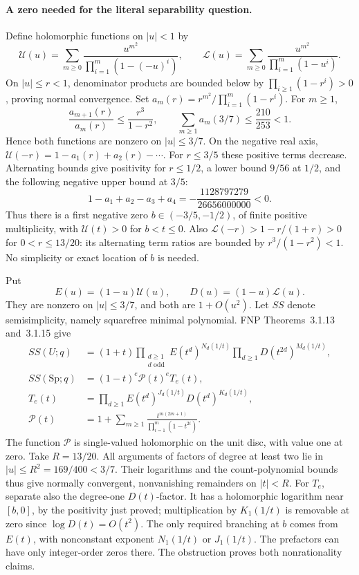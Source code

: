 \paragraph{A zero needed for the literal separability question.}
Define holomorphic functions on \(|u|<1\) by
\[
 \mathcal U(u)=\sum_{m\ge0}
       \frac{u^{m^2}}{\prod_{i=1}^m(1-(-u)^i)},\qquad
 \mathcal L(u)=\sum_{m\ge0}
       \frac{u^{m^2}}{\prod_{i=1}^m(1-u^i)}.
\]
On \(|u|\le r<1\), denominator products are bounded below by
\(\prod_{i\ge1}(1-r^i)>0\), proving normal convergence.
Set
\(a_m(r)=r^{m^2}/\prod_{i=1}^m(1-r^i)\).
For \(m\ge1\),
\[
 \frac{a_{m+1}(r)}{a_m(r)}
 \le\frac{r^3}{1-r^2},\qquad
 \sum_{m\ge1}a_m(3/7)\le\frac{210}{253}<1.
\]
Hence both functions are nonzero on \(|u|\le3/7\).
On the negative real axis,
\(\mathcal U(-r)=1-a_1(r)+a_2(r)-\cdots\).
For \(r\le3/5\) these positive terms decrease. Alternating bounds
give positivity for \(r\le1/2\), a lower bound \(9/56\) at \(1/2\),
and the following negative upper bound at \(3/5\):
\[
 1-a_1+a_2-a_3+a_4
 =-\frac{1128797279}{26656000000}<0.
\]
Thus there is a first negative zero \(b\in(-3/5,-1/2)\), of finite
positive multiplicity, with \(\mathcal U(t)>0\) for \(b<t\le0\).
Also \(\mathcal L(-r)>1-r/(1+r)>0\) for \(0<r\le13/20\):
its alternating term ratios are bounded by \(r^3/(1-r^2)<1\).
No simplicity or exact location of \(b\) is needed.

Put
\[
 E(u)=(1-u)\mathcal U(u),\qquad
 D(u)=(1-u)\mathcal L(u).
\]
They are nonzero on \(|u|\le3/7\), and both are \(1+O(u^2)\).
Let \(SS\) denote semisimplicity, namely squarefree minimal polynomial.
FNP Theorems~3.1.13 and~3.1.15 give
\[
\begin{aligned}
 SS(U;q)&=(1+t)
  \prod_{\substack{d\ge1\\d\text{ odd}}}E(t^d)^{N_d(1/t)}
  \prod_{d\ge1}D(t^{2d})^{M_d(1/t)},\\
 SS(\mathrm{Sp};q)&=(1-t)^e\mathcal P(t)^e T_e(t),\\
 T_e(t)&=\prod_{d\ge1}E(t^d)^{J_d(1/t)}D(t^d)^{K_d(1/t)},\\
 \mathcal P(t)&=1+\sum_{m\ge1}
       \frac{t^{m(2m+1)}}{\prod_{i=1}^m(1-t^{2i})}.
\end{aligned}
\]
The function \(\mathcal P\) is single-valued holomorphic on the unit
disc, with value one at zero.
Take \(R=13/20\). All arguments of factors of degree at least two
lie in \(|u|\le R^2=169/400<3/7\).
Their logarithms and the count-polynomial bounds thus give normally
convergent, nonvanishing remainders on \(|t|<R\).
For \(T_e\), separate also the degree-one \(D(t)\)-factor.
It has a holomorphic logarithm near \([b,0]\), by the positivity
just proved; multiplication by \(K_1(1/t)\) is removable at zero
since \(\log D(t)=O(t^2)\).
The only required branching at \(b\) comes from \(E(t)\), with
nonconstant exponent \(N_1(1/t)\) or \(J_1(1/t)\).
The prefactors can have only integer-order zeros there.
The obstruction proves both nonrationality claims.

